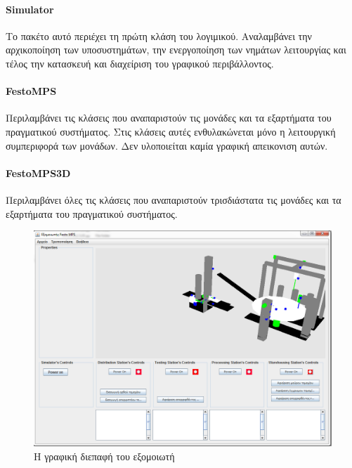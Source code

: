 \documentclass[a4paper,12pt,twoside]{report}
\begin{document}
{\begin{appendices}
			\paragraph{Simulator} {Το πακέτο αυτό περιέχει τη πρώτη κλάση του λογιμικού. Αναλαμβάνει την αρχικοποίηση των υποσυστημάτων, την ενεργοποίηση των νημάτων λειτουργίας και τέλος την κατασκευή και διαχείριση του γραφικού περιβάλλοντος.
			}
			
			\paragraph{FestoMPS} {Περιλαμβάνει τις κλάσεις που αναπαριστούν τις μονάδες και τα εξαρτήματα του πραγματικού συστήματος. Στις κλάσεις αυτές ενθυλακώνεται μόνο η λειτουργική συμπεριφορά των μονάδων. Δεν υλοποιείται καμία γραφική απεικονιση αυτών.
			}
			
			\paragraph{FestoMPS3D} {Περιλαμβάνει όλες τις κλάσεις που αναπαριστούν τρισδιάστατα τις μονάδες και τα εξαρτήματα του πραγματικού συστήματος.
			}
			
			\begin{figure}[hp]
					\centering
					\includegraphics[scale=0.30]{FestoMPSSimulator.png}
					\caption{Η γραφική διεπαφή του εξομοιωτή}
					\label{φωτ:Η γραφική διεπαφή του εξομοιωτή}
				\end{figure}
		
\end{appendices}


	\cleardoublepage
	\label{κεφ.:Ελληνόγλωσση Βιβλιογραφία}
	\printbibliography[title={Ελληνόγλωσση Βιβλιογραφία}, keyword=greek]


}
\end{document}
